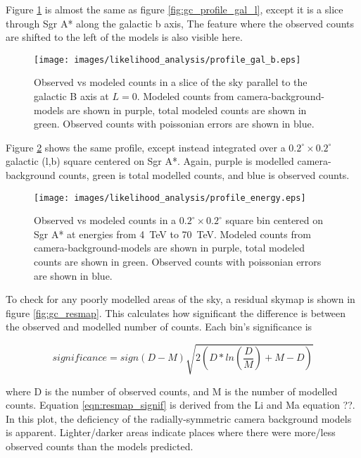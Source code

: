   Figure \ref{fig:gc_profile_gal_b} is almost the same as figure \ref{fig:gc_profile_gal_l}, except it is a slice through Sgr A* along the galactic b axis,
  The feature where the observed counts are shifted to the left of the models is also visible here.

  \begin{figure}[h]
    \centering
    \texttt{[image: images/likelihood\_analysis/profile\_gal\_b.eps]}
    \caption[Galactic Center Profile vs Galactic B]{
      Observed vs modeled counts in a slice of the sky parallel to the galactic B axis at $L=0$.
      Modeled counts from camera-background-models are shown in purple, total modeled counts are shown in green.
      Observed counts with poissonian errors are shown in blue.
    }
    \label{fig:gc_profile_gal_b}
  \end{figure}

  Figure \ref{fig:gc_profile_energy} shows the same profile, except instead integrated over a ${0.2}^{\circ}\times{0.2}^{\circ}$ galactic (l,b) square centered on Sgr A*.
  Again, purple is modelled camera-background counts, green is total modelled counts, and blue is observed counts.
  
  \begin{figure}[h]
    \centering
    \texttt{[image: images/likelihood\_analysis/profile\_energy.eps]}
    \caption[Galactic Center Profile vs Energy]{
      Observed vs modeled counts in a ${0.2}^{\circ}\times{0.2}^{\circ}$ square bin centered on Sgr A* at energies from \SI{4}{TeV} to \SI{70}{TeV}.
      Modeled counts from camera-background-models are shown in purple, total modeled counts are shown in green.
      Observed counts with poissonian errors are shown in blue.
    }
    \label{fig:gc_profile_energy}
  \end{figure}
  
  To check for any poorly modelled areas of the sky, a residual skymap is shown in figure \ref{fig:gc_resmap}.
  This calculates how significant the difference is between the observed and modelled number of counts.
  Each bin's significance is 
  
  \begin{equation}
    \label{eqn:resmap_signif}
    significance = sign(D-M) \sqrt{ 2 \left ( D * ln \left ( \frac{D}{M} \right ) + M - D \right ) }
  \end{equation}
  
  where D is the number of observed counts, and M is the number of modelled counts.
  Equation \ref{eqn:resmap_signif} is derived from the Li and Ma equation ??. 
  In this plot, the deficiency of the radially-symmetric camera background models is apparent.
  Lighter/darker areas indicate places where there were more/less observed counts than the models predicted.
  
